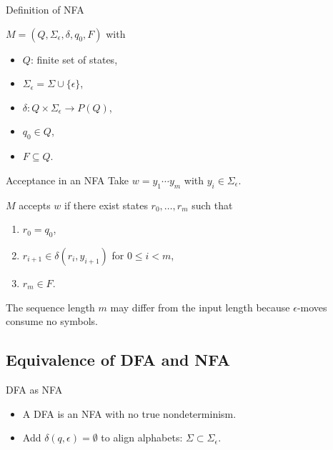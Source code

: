 \documentclass[aspectratio=169]{beamer}
\begin{document}
\begin{frame}{Definition of NFA}
  \begin{definition}[NFA]
    $M = (Q,\Sigma_{\epsilon},\delta,q_0,F)$ with
    \begin{itemize}
      \item $Q$: finite set of states,
      \item $\Sigma_{\epsilon} = \Sigma \cup \{\epsilon\}$,
      \item $\delta: Q \times \Sigma_{\epsilon} \to P(Q)$,
      \item $q_0 \in Q$,
      \item $F \subseteq Q$.
    \end{itemize}
  \end{definition}
\end{frame}

\begin{frame}{Acceptance in an NFA}
  Take $w = y_1 \cdots y_m$ with $y_i \in \Sigma_{\epsilon}$.
  \begin{theorem}
    $M$ accepts $w$ if there exist states $r_0,\ldots,r_m$ such that
    \begin{enumerate}
      \item $r_0 = q_0$,
      \item $r_{i+1} \in \delta(r_i, y_{i+1})$ for $0 \le i < m$,
      \item $r_m \in F$.
    \end{enumerate}
  \end{theorem}
  \begin{note}
    The sequence length $m$ may differ from the input length because $\epsilon$-moves consume no symbols.
  \end{note}
\end{frame}

\subsection{Equivalence of DFA and NFA}

\begin{frame}{DFA as NFA}
  \begin{itemize}
    \item A DFA is an NFA with no true nondeterminism.
    \item Add $\delta(q,\epsilon) = \emptyset$ to align alphabets: $\Sigma \subset \Sigma_{\epsilon}$.
  \end{itemize}
\end{frame}
\end{document}
